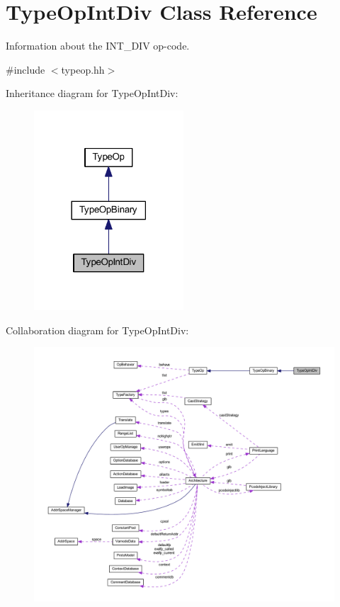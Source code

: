 \hypertarget{class_type_op_int_div}{}\section{Type\+Op\+Int\+Div Class Reference}
\label{class_type_op_int_div}


Information about the I\+N\+T\+\_\+\+D\+IV op-\/code.  




{\ttfamily \#include $<$typeop.\+hh$>$}



Inheritance diagram for Type\+Op\+Int\+Div\+:
\nopagebreak
\begin{figure}[H]
\begin{center}
\leavevmode
\includegraphics[width=158pt]{class_type_op_int_div__inherit__graph}
\end{center}
\end{figure}


Collaboration diagram for Type\+Op\+Int\+Div\+:
\nopagebreak
\begin{figure}[H]
\begin{center}
\leavevmode
\includegraphics[width=350pt]{class_type_op_int_div__coll__graph}
\end{center}
\end{figure}
